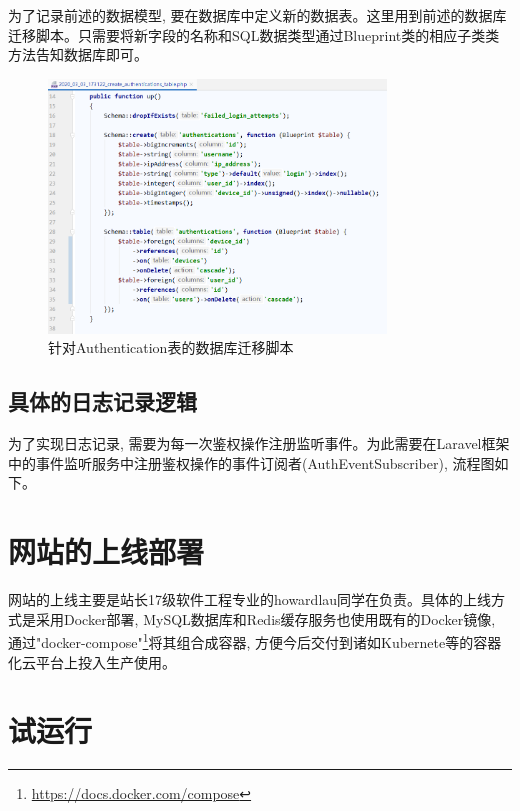 为了记录前述的数据模型, 要在数据库中定义新的数据表。这里用到前述的数据库迁移脚本。只需要将新字段的名称和SQL数据类型通过Blueprint类的相应子类类方法告知数据库即可。

\begin{figure}[h]
    \centering
    \includegraphics[width=0.8\textwidth]{support-files/4.6.1-migration-script.png}
    \caption{针对Authentication表的数据库迁移脚本}
    \label{fig:authmigratescript}
\end{figure}


\subsection{具体的日志记录逻辑}

为了实现日志记录, 需要为每一次鉴权操作注册监听事件。为此需要在Laravel框架中的事件监听服务中注册鉴权操作的事件订阅者(AuthEventSubscriber), 流程图如下。



\section{网站的上线部署}

网站的上线主要是站长17级软件工程专业的howardlau同学在负责。具体的上线方式是采用Docker部署, MySQL数据库和Redis缓存服务也使用既有的Docker镜像, 通过"docker-compose"\footnote{\url{https://docs.docker.com/compose}}将其组合成容器, 方便今后交付到诸如Kubernete等的容器化云平台上投入生产使用。

\section{试运行}
\label{sec:preop}

